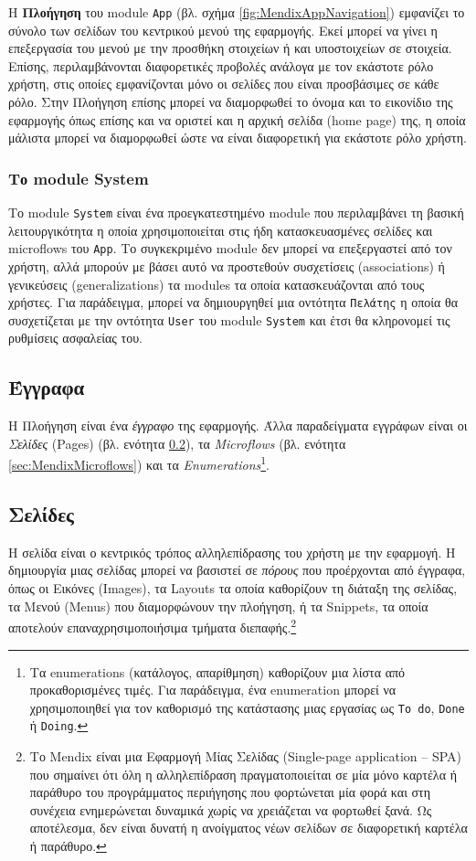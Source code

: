             Η \textbf{Πλοήγηση} του module \texttt{App} (βλ. σχήμα \ref{fig:MendixAppNavigation}) εμφανίζει το σύνολο των σελίδων του κεντρικού μενού της εφαρμογής. Εκεί μπορεί να γίνει η επεξεργασία του μενού με την προσθήκη στοιχείων ή και υποστοιχείων σε στοιχεία. Επίσης, περιλαμβάνονται διαφορετικές προβολές ανάλογα με τον εκάστοτε ρόλο χρήστη, στις οποίες εμφανίζονται μόνο οι σελίδες που είναι προσβάσιμες σε κάθε ρόλο. Στην Πλοήγηση επίσης μπορεί να διαμορφωθεί το όνομα και το εικονίδιο της εφαρμογής όπως επίσης και να οριστεί και η αρχική σελίδα (home page) της, η οποία μάλιστα μπορεί να διαμορφωθεί ώστε να είναι διαφορετική για εκάστοτε ρόλο χρήστη. \cite{mendixDoc}

            \subsubsection{Το module System}
                Το module \texttt{System} είναι ένα προεγκατεστημένο module που περιλαμβάνει τη βασική λειτουργικότητα η οποία χρησιμοποιείται στις ήδη κατασκευασμένες σελίδες και microflows του \texttt{App}. Το συγκεκριμένο module δεν μπορεί να επεξεργαστεί από τον χρήστη, αλλά μπορούν με βάσει αυτό να προστεθούν συσχετίσεις (associations) ή γενικεύσεις (generalizations) τα modules τα οποία κατασκευάζονται από τους χρήστες. Για παράδειγμα, μπορεί να δημιουργηθεί μια οντότητα \texttt{Πελάτης} η οποία θα συσχετίζεται με την οντότητα \texttt{User} του module \texttt{System} και έτσι θα κληρονομεί τις ρυθμίσεις ασφαλείας του. \cite{mendixSystemModule}

        \subsection{Έγγραφα}
            Η Πλοήγηση είναι ένα \textit{έγγραφο} της εφαρμογής. Άλλα παραδείγματα εγγράφων είναι οι \textit{Σελίδες} (Pages) (βλ. ενότητα \ref{sec:MendixPages}), τα \textit{Microflows} (βλ. ενότητα \ref{sec:MendixMicroflows}) και τα \textit{Enumerations}\footnote{Τα enumerations (κατάλογος, απαρίθμηση) καθορίζουν μια λίστα από προκαθορισμένες τιμές. Για παράδειγμα, ένα enumeration μπορεί να χρησιμοποιηθεί για τον καθορισμό της κατάστασης μιας εργασίας ως \texttt{To do}, \texttt{Done} ή \texttt{Doing}.}.

        \subsection{Σελίδες} \label{sec:MendixPages}
            Η σελίδα είναι ο κεντρικός τρόπος αλληλεπίδρασης του χρήστη με την εφαρμογή. Η δημιουργία μιας σελίδας μπορεί να βασιστεί σε \textit{πόρους} που προέρχονται από έγγραφα, όπως οι Εικόνες (Images), τα Layouts τα οποία καθορίζουν τη διάταξη της σελίδας, τα Μενού (Menus) που διαμορφώνουν την πλοήγηση, ή τα Snippets, τα οποία αποτελούν επαναχρησιμοποιήσιμα τμήματα διεπαφής.\footnote{Το Mendix είναι μια Εφαρμογή Μίας Σελίδας (Single-page application -- SPA) που σημαίνει ότι όλη η αλληλεπίδραση πραγματοποιείται σε μία μόνο καρτέλα ή παράθυρο του προγράμματος περιήγησης που φορτώνεται μία φορά και στη συνέχεια ενημερώνεται δυναμικά χωρίς να χρειάζεται να φορτωθεί ξανά. Ως αποτέλεσμα, δεν είναι δυνατή η ανοίγματος νέων σελίδων σε διαφορετική καρτέλα ή παράθυρο.}

